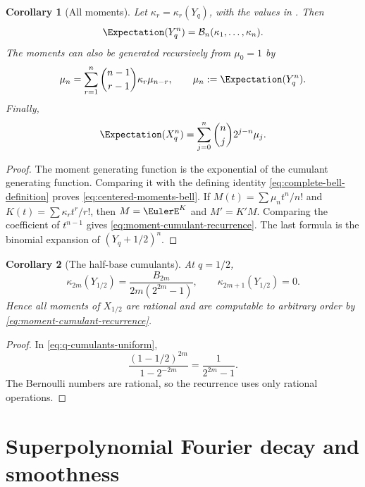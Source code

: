 \documentclass[11pt,a4paper,oneside,openany]{book}
\newtheorem{corollary}[corollary]{Corollary}
\theoremstyle{definition}
\theoremstyle{remark}
\begin{document}
\begin{corollary}[All moments]\label{cor:geometric-uniform-moments}
Let $\kappa_r=\kappa_r(Y_q)$, with the values in
.  Then
\begin{equation}\label{eq:centered-moments-bell}
 \Expectation(Y_q^n)=\mathcal B_n(\kappa_1,\ldots,\kappa_n).
\end{equation}
The moments can also be generated recursively from $\mu_0=1$ by
\begin{equation}\label{eq:moment-cumulant-recurrence}
 \mu_n=\sum_{r=1}^{n}\binom{n-1}{r-1}\kappa_r\mu_{n-r},
 \qquad \mu_n:=\Expectation(Y_q^n).
\end{equation}
Finally,
\begin{equation}\label{eq:raw-moments-from-centered}
 \Expectation(X_q^n)=\sum_{j=0}^{n}\binom nj2^{j-n}\mu_j.
\end{equation}
\end{corollary}

\begin{proof}
The moment generating function is the exponential of the cumulant generating function.  Comparing it with the defining identity
\eqref{eq:complete-bell-definition} proves \eqref{eq:centered-moments-bell}.  If
$M(t)=\sum\mu_nt^n/n!$ and $K(t)=\sum\kappa_rt^r/r!$, then
$M=\EulerE^K$ and $M'=K'M$.  Comparing the coefficient of $t^{n-1}$ gives
\eqref{eq:moment-cumulant-recurrence}.  The last formula is the binomial expansion of $(Y_q+1/2)^n$.
\end{proof}

\begin{corollary}[The half-base cumulants]\label{cor:halfbase-cumulants}
At $q=1/2$,
\begin{equation}\label{eq:halfbase-cumulants}
 \kappa_{2m}(Y_{1/2})
 =\frac{B_{2m}}{2m(2^{2m}-1)},
 \qquad
 \kappa_{2m+1}(Y_{1/2})=0.
\end{equation}
Hence all moments of $X_{1/2}$ are rational and are computable to arbitrary order by \eqref{eq:moment-cumulant-recurrence}.
\end{corollary}

\begin{proof}
In \eqref{eq:q-cumulants-uniform},
\[
 \frac{(1-1/2)^{2m}}{1-2^{-2m}}
 =\frac1{2^{2m}-1}.
\]
The Bernoulli numbers are rational, so the recurrence uses only rational operations.
\end{proof}

\section{Superpolynomial Fourier decay and smoothness}
\end{document}
